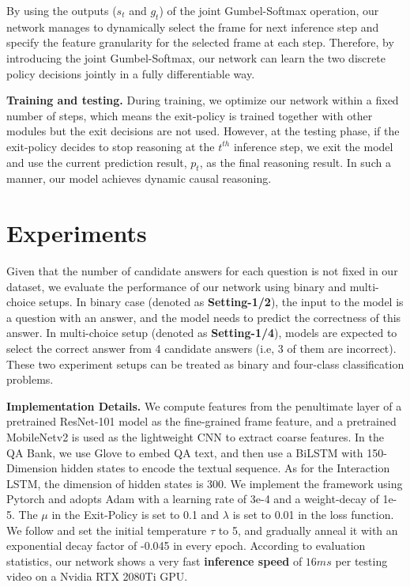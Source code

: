 \documentclass[final]{cvpr}
\begin{document}
By using the outputs ($s_t$ and $g_t$) of the joint Gumbel-Softmax operation, our network manages to dynamically select the frame for next inference step and specify the feature granularity for the selected frame at each step. 
Therefore, by introducing the joint Gumbel-Softmax, our network can learn the two discrete policy decisions jointly in a fully differentiable way.

{\bf Training and testing.} During training, we optimize our network within a fixed number of steps, which means the exit-policy is trained together with other modules but the exit decisions 
are not used. However, at the testing phase, if the exit-policy decides to stop reasoning at the $t^{th}$ inference step, we exit the model and use the current prediction result, $p_t$, as the final reasoning result. In such a manner, our model achieves dynamic causal reasoning.

\section{Experiments} \label{sec:exp}
Given that the number of candidate answers for each question is not fixed in our dataset, we evaluate the performance of our network using binary and multi-choice setups. In binary case (denoted as \textbf{Setting-1/2}), the input to the model is a question with an answer, and the model needs to predict the correctness of this answer. In multi-choice setup (denoted as \textbf{Setting-1/4}), models are expected to select the correct answer from 4 candidate answers (i.e, 3 of them are incorrect). These two experiment setups can be treated as binary and four-class classification problems.

{\bf Implementation Details.} 
We compute features from the penultimate layer of a pretrained ResNet-101 model \cite{he2016deep} as the fine-grained frame feature,
and a pretrained MobileNetv2 \cite{sandler2018mobilenetv2} is used as the lightweight CNN to extract coarse features. In the QA Bank, we use Glove \cite{Pennington14glove:global} to embed QA text, and then use a BiLSTM with 150-Dimension hidden states to encode the textual sequence.  As for the Interaction LSTM, the dimension of hidden states is 300.
We implement the framework using Pytorch and adopts Adam \cite{kingma2014adam} with a learning rate of 3e-4 and a weight-decay of 1e-5. The $\mu$ in the Exit-Policy is set to 0.1 and $\lambda$ is set to 0.01 in the loss function. We follow \cite{jang2016categorical} and set the initial temperature $\tau$ to 5, and gradually anneal it with an exponential decay factor of -0.045 in every epoch. According to evaluation statistics, our network shows a very fast \textbf{inference speed} of $16ms$ per testing video on a Nvidia RTX 2080Ti GPU.
\end{document}
